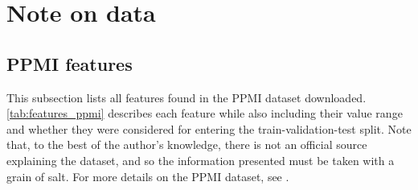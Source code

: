 \section{Note on data}
\label{sec:data}

\subsection{PPMI features}
 This subsection lists all features found in the PPMI dataset downloaded.
 \cref{tab:features_ppmi} describes each feature while also including their value range
 and whether they were considered for entering the train-validation-test split.
 Note that, to the best of the author's knowledge, 
 there is not an official source explaining the dataset,
 and so the information presented must be taken with a grain of salt.
 For more details on the PPMI dataset, see \cite{Craig2021, Kern2021}.

